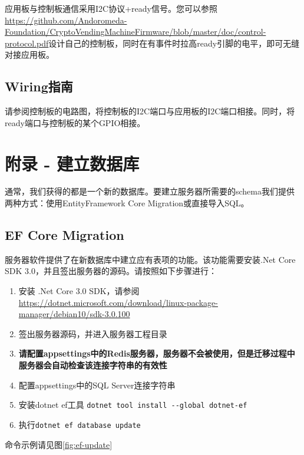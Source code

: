 \documentclass[a4paper,11pt]{article}
\theoremstyle{definition}
\begin{document}
应用板与控制板通信采用I2C协议+ready信号。您可以参照 \\ \url{https://github.com/Andoromeda-Foundation/CryptoVendingMachineFirmware/blob/master/doc/control-protocol.pdf}设计自己的控制板，同时在有事件时拉高ready引脚的电平，即可无缝对接应用板。

\subsection{Wiring指南}

请参阅控制板的电路图，将控制板的I2C端口与应用板的I2C端口相接。同时，将ready端口与控制板的某个GPIO相接。


\appendix

\section{附录 - 建立数据库}\label{sec:newdb}

通常，我们获得的都是一个新的数据库。要建立服务器所需要的schema我们提供两种方式：使用EntityFramework Core Migration或直接导入SQL。

\subsection{EF Core Migration}
服务器软件提供了在新数据库中建立应有表项的功能。该功能需要安装.Net Core SDK 3.0，并且签出服务器的源码。请按照如下步骤进行：

\begin{enumerate}
  \item 安装 .Net Core 3.0 SDK，请参阅 \\ \url{https://dotnet.microsoft.com/download/linux-package-manager/debian10/sdk-3.0.100}
  \item 签出服务器源码，并进入服务器工程目录
  \item \textbf{请配置appsettings中的Redis服务器，服务器不会被使用，但是迁移过程中服务器会自动检查该连接字符串的有效性}
  \item 配置appsettings中的SQL Server连接字符串
  \item 安装dotnet ef工具 \verb|dotnet tool install --global dotnet-ef|
  \item 执行\verb|dotnet ef database update|
\end{enumerate}

命令示例请见图\ref{fig:ef-update}
\end{document}
